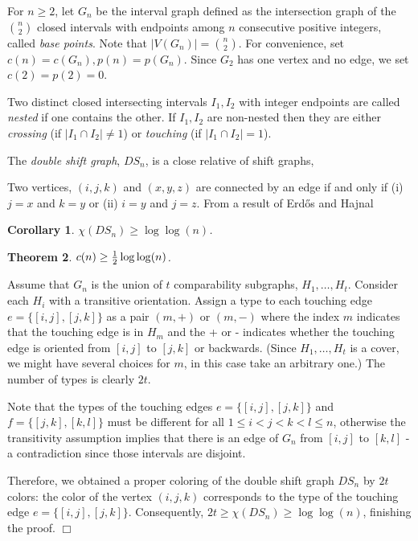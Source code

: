 \documentclass[12pt]{article}
\newtheorem{theorem}{Theorem}%
\newtheorem{corollary}[theorem]{Corollary}
\def\qed{\ifhmode\unskip\nobreak\fi\quad\ifmmode\Box\else$\Box$\fi}
\def\qed{\hfill $\Box$}
\begin{document}
For $n\ge 2$, let $G_n$ be the interval graph defined as the intersection graph
of the $n\choose 2$ closed intervals with endpoints among $n$ consecutive positive integers,
called {\em base points}. Note that $|V(G_n)|={n\choose 2}$.
For convenience, set $c(n)=c(G_n),p(n)=p(G_n)$.
Since $G_2$ has one vertex and no edge, we set $c(2)=p(2)=0$.

Two distinct closed intersecting intervals $I_1,I_2$ with
integer endpoints are called {\em nested } if one contains the other.
If $I_1,I_2$ are non-nested then they are either {\em crossing}
(if  $|I_1\cap I_2|\ne 1$) or {\em touching} (if  $|I_1\cap I_2|=1$).

The {\em double shift graph}, $DS_n$, is a close relative of shift graphs,

Two vertices, $(i, j, k)$ and $(x, y, z)$ are connected by an edge if and only if
(i) $j=x$ and $k=y$ or (ii) $i=y$ and $j=z$. From a result of Erd\H os and Hajnal

\begin{corollary}\label{doblesh} $\chi(DS_n)\ge\log\log(n)$.
\end{corollary}

\begin{theorem}\label{loglog} $c(n)\ge  {1\over 2}\log\log(n)$.
\end{theorem}

  Assume that $G_n$ is the union of $t$ comparability subgraphs,
$H_1,\dots,H_t$. Consider each $H_i$ with a transitive orientation.
     Assign a type to each touching edge $e=\{[i,j],[j,k]\}$
    as a pair $(m,+)$ or $(m,-)$ where the index $m$ indicates that the touching edge is
    in $H_m$ and the + or - indicates whether the touching edge is oriented from $[i,j]$
    to $[j,k]$ or backwards.
    (Since $H_1,\dots,H_t$ is a cover, we might have several choices for $m$, in this case
    take an arbitrary one.) The number of types is clearly $2t$.

    Note that the types of the touching edges $e=\{[i,j],[j,k]\}$ and $f=\{[j,k],[k,l]\}$ must be different
    for all $1\le i<j<k<l\le n$, otherwise the transitivity assumption implies that there is an edge of $G_n$
    from $[i,j]$ to $[k,l]$ - a contradiction since those intervals are disjoint.

    Therefore, we obtained a proper coloring of the double shift graph $DS_n$ by $2t$ colors:
    the color of the vertex $(i, j, k)$ corresponds to the type of
    the touching edge $e=\{[i,j],[j,k]\}$. Consequently, $2t\ge \chi(DS_n)\ge \log\log(n)$, finishing the proof.  \qed
\end{document}
